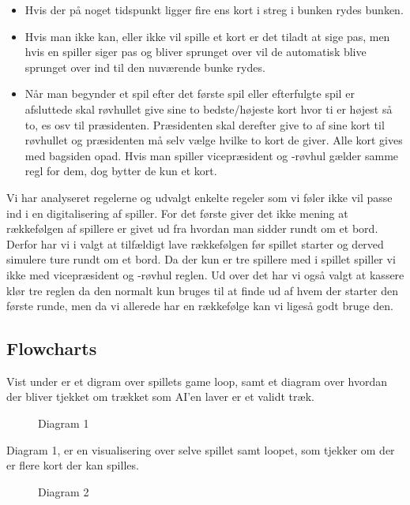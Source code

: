 \documentclass[a4paper, 12pt]{article}
\begin{document}
\begin{itemize}
	\item Hvis der på noget tidspunkt ligger fire ens kort i streg i bunken rydes bunken.
	\item Hvis man ikke kan, eller ikke vil spille et kort er det tiladt at sige pas, men hvis en spiller siger pas og bliver sprunget over vil de automatisk blive sprunget over ind til den nuværende bunke rydes.
	\item Når man begynder et spil efter det første spil eller efterfulgte spil er afsluttede skal røvhullet give sine to bedste/højeste kort hvor ti er højest så to, es osv til præsidenten. Præsidenten skal derefter give to af sine kort til røvhullet og præsidenten må selv vælge hvilke to kort de giver. Alle kort gives med bagsiden opad. Hvis man spiller vicepræsident og -røvhul gælder samme regl for dem, dog bytter de kun et kort. 
\end{itemize}

Vi har analyseret regelerne og udvalgt enkelte regeler som vi føler ikke vil passe ind i en digitalisering af spiller. For det første giver det ikke mening at rækkefølgen af spillere er givet ud fra hvordan man sidder rundt om et bord. Derfor har vi i valgt at tilfældigt lave rækkefølgen før spillet starter og derved simulere ture rundt om et bord. Da der kun er tre spillere med i spillet spiller vi ikke med vicepræsident og -røvhul reglen.
Ud over det har vi også valgt at kassere klør tre reglen da den normalt kun bruges til at finde ud af hvem der starter den første runde, men da vi allerede har en rækkefølge kan vi ligeså godt bruge den.

\vfill
\pagebreak

\subsection{Flowcharts}
Vist under er et digram over spillets game loop, samt et diagram over hvordan der bliver tjekket om trækket som AI'en laver er et validt træk.
\begin{figure}[H]
	\centering
	\resizebox{.5\linewidth}{!}{}
	\caption{Diagram 1}
\end{figure}
Diagram 1, er en visualisering over selve spillet samt loopet, som tjekker om der er flere kort der kan spilles.
\bigbreak

\begin{figure}[H]
	\centering
	\resizebox{.5\linewidth}{!}{}
	\caption{Diagram 2}
\end{figure}
\end{document}
